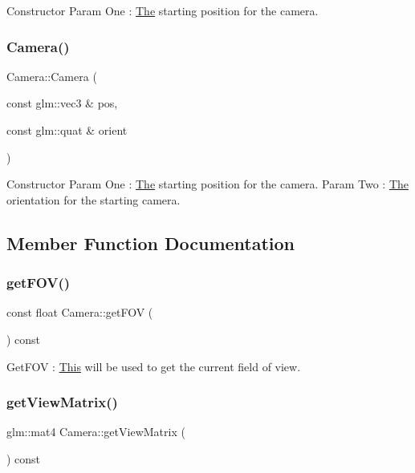 Constructor Param One \+: \mbox{\hyperlink{class_the}{The}} starting position for the camera. \mbox{\label{class_camera_a9e5dda23dca2ae363424f7a9025f55c9}} 
\subsubsection{\texorpdfstring{Camera()}{Camera()}\hspace{0.1cm}{\footnotesize\ttfamily [3/3]}}
{\footnotesize\ttfamily Camera\+::\+Camera (\begin{DoxyParamCaption}\item[{const glm\+::vec3 \&}]{pos,  }\item[{const glm\+::quat \&}]{orient }\end{DoxyParamCaption})\hspace{0.3cm}{\ttfamily [inline]}}

Constructor Param One \+: \mbox{\hyperlink{class_the}{The}} starting position for the camera. Param Two \+: \mbox{\hyperlink{class_the}{The}} orientation for the starting camera. 

\subsection{Member Function Documentation}
\mbox{\label{class_camera_ab16a5e8f683ee2d598578a2d9836a24a}} 
\subsubsection{\texorpdfstring{get\+F\+O\+V()}{getFOV()}}
{\footnotesize\ttfamily const float Camera\+::get\+F\+OV (\begin{DoxyParamCaption}{ }\end{DoxyParamCaption}) const\hspace{0.3cm}{\ttfamily [inline]}}

Get\+F\+OV \+: \mbox{\hyperlink{class_this}{This}} will be used to get the current field of view. \mbox{\label{class_camera_a2f90e661a78172675ca06ea69667b531}} 
\subsubsection{\texorpdfstring{get\+View\+Matrix()}{getViewMatrix()}}
{\footnotesize\ttfamily glm\+::mat4 Camera\+::get\+View\+Matrix (\begin{DoxyParamCaption}{ }\end{DoxyParamCaption}) const\hspace{0.3cm}{\ttfamily [inline]}}

